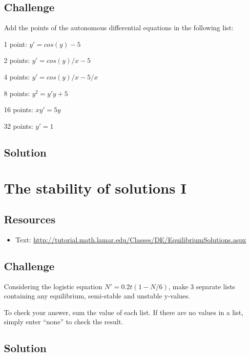 \subsection*{Challenge}
Add the points of the autonomous differential equations in the following list:

1 point: $y' = cos(y)-5$

2 points: $y' = cos(y)/x - 5$

4 points: $y' = cos(y)/x - 5/x$

8 points: $y^2 = y' y+5$

16 points: $x y' = 5 y$

32 points: $y' = 1$

\subsection*{Solution}
\six{}

\timebox




\newpage
\section{The stability of solutions I}

\subsection*{Resources}
\begin{itemize}
    \item Text: \url{http://tutorial.math.lamar.edu/Classes/DE/EquilibriumSolutions.aspx}
\end{itemize}

\subsection*{Challenge}
Considering the logistic equation $N'=0.2t(1-N/6)$, make 3 separate lists containing any equilibrium, semi-stable and unstable y-values.

To check your answer, sum the value of each list. If there are no values in a list, simply enter ``none'' to check the result.

\subsection*{Solution}
